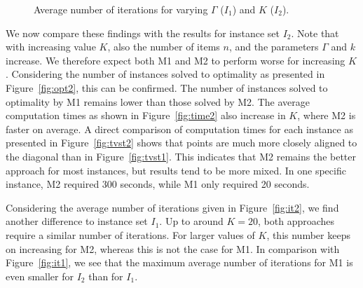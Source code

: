 \documentclass[a4paper,11pt,abstracton]{scrartcl}
\theoremstyle{definition}
\theoremstyle{remark}
\begin{document}
\begin{figure}[htbp]
\begin{center}
%
\hfill
{}
\end{center}
\caption{Average number of iterations for varying $\Gamma$ ($I_1$) and $K$ ($I_2$).\label{fig:it}}
\end{figure}	

We now compare these findings with the results for instance set $I_2$. Note that with increasing value $K$, also the number of items $n$, and the parameters $\Gamma$ and $k$ increase. We therefore expect both M1 and M2 to perform worse for increasing $K$. Considering the number of instances solved to optimality as presented in Figure~\ref{fig:opt2}, this can be confirmed. The number of instances solved to optimality by M1 remains lower than those solved by M2. The average computation times as shown in Figure~\ref{fig:time2} also increase in $K$, where M2 is faster on average. A direct comparison of computation times for each instance as presented in Figure~\ref{fig:tvst2} shows that points are much more closely aligned to the diagonal than in Figure~\ref{fig:tvst1}. This indicates that M2 remains the better approach for most instances, but results tend to be more mixed. In one specific instance, M2 required 300 seconds, while M1 only required 20 seconds.

Considering the average number of iterations given in Figure~\ref{fig:it2}, we find another difference to instance set $I_1$. Up to around $K=20$, both approaches require a similar number of iterations. For larger values of $K$, this number keeps on increasing for M2, whereas this is not the case for M1. In comparison with Figure~\ref{fig:it1}, we see that the maximum average number of iterations for M1 is even smaller for $I_2$ than for $I_1$.
\end{document}
